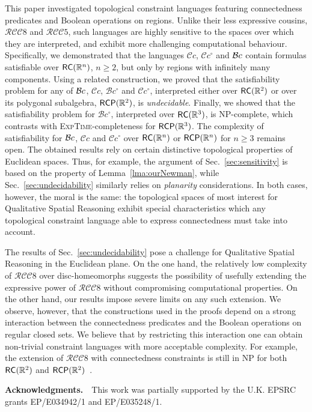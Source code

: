 \documentclass{article}
\newcommand{\NP}{\textsc{NP}}
\newcommand{\ExpTime}{\textsc{ExpTime}}
\newcommand{\cBci}{\ensuremath{\mathcal{B}c^\circ}}
\newcommand{\RCCE}{\ensuremath{\mathcal{RCC}8}}\newcommand{\RCCF}{\ensuremath{\mathcal{RCC}5}}\newcommand{\BRCCE}{\ensuremath{\mathcal{BRCC}8}}\newcommand{\RCCEc}{\ensuremath{\RCCE{}c}}\newcommand{\RCCEci}{\ensuremath{\RCCE{}c^\circ}}\newcommand{\cBCc}{\ensuremath{\mathcal{C}c}}\newcommand{\cBCci}{\ensuremath{\mathcal{C}c^\circ}}
\newcommand{\R}{\mathbb{R}}
\newcommand{\RC}{{\sf RC}}
\newcommand{\RCP}{{\sf RCP}}
\begin{document}
This paper investigated topological constraint
languages featuring connectedness predicates and Boolean operations on
regions.  Unlike their less expressive cousins, \RCCE{} and \RCCF,
such languages are highly sensitive to the spaces over which they
are interpreted, and exhibit more challenging computational
behaviour. Specifically, we demonstrated that the languages $\cBCc$,
$\cBCci$ and $\mathcal{B}c$ contain formulas satisfiable over $\RC(\R^n)$, $n
\geq 2$, but only by regions with infinitely many components. Using a
related construction, we proved that the satisfiability problem for
any of $\mathcal{B}c$, $\cBCc$, $\cBci$ and $\cBCci$, interpreted either over
$\RC(\R^2)$ or over its polygonal subalgebra, $\RCP(\R^2)$, is
\emph{undecidable}. Finally, we showed that the satisfiability problem
for $\cBci$, interpreted over $\RC(\R^3)$, is \NP-complete, which
contrasts with \ExpTime-completeness for $\RCP(\R^3)$.  The complexity
of satisfiability for $\mathcal{B}c$, $\cBCc$ and $\cBCci$ over $\RC(\R^n)$ or
$\RCP(\R^n)$ for $n \geq 3$ remains open. 
The obtained results rely on certain
distinctive topological properties of Euclidean spaces. 
Thus, for example, the argument of
Sec.~\ref{sec:sensitivity} is based on the property of
Lemma~\ref{lma:ourNewman}, while Sec.~\ref{sec:undecidability}
similarly relies on {\em planarity} considerations. In both cases,
however, the moral is the same: the topological spaces of most
interest for Qualitative Spatial Reasoning exhibit special
characteristics which any topological constraint language able to
express connectedness must take into account.

The results of Sec.~\ref{sec:undecidability} pose a challenge for
Qualitative Spatial Reasoning in the Euclidean plane.  On the one hand, the
relatively low complexity of \RCCE{} over disc-homeomorphs suggests
the possibility of usefully extending the expressive power of \RCCE{}
without compromising computational properties. On the other hand, our
results impose severe limits on any such extension.  We observe,
however, that the constructions used in the proofs depend on a strong
interaction between the connectedness predicates and the Boolean
operations on regular closed sets. We believe that by restricting this
interaction one can obtain non-trivial constraint languages with more
acceptable complexity. For example, the extension of \RCCE{} with
connectedness constraints is still in \NP{} for both $\RC(\R^2)$ and
$\RCP(\R^2)$~\cite{ijcai:kphz10}.


\smallskip
\noindent
{\bf Acknowledgments.}\ \ This work was partially supported by the U.K. EPSRC grants EP/E034942/1 and EP/E035248/1.
\end{document}
